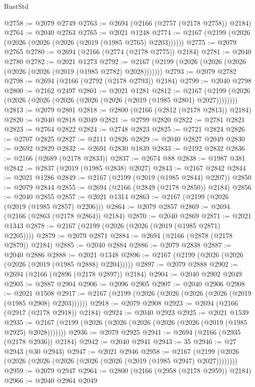 \begin{lexlean}{RustStd}
\begin{coremodule}
@2758 := @2079 @2749
@2763 := @2694 (@2166 (@2757 (@2178 @2758)) @2184)
@2764 := @2040 @2763
@2765 := @2021 @1248
@2774 := @2167 (@2199 (@2026 (@2026 (@2026 (@2026 (@2019 (@1985 @2765) @2203))))))
@2775 := @2079 @2765
@2780 := @2694 (@2166 (@2774 (@2178 @2775)) @2184)
@2781 := @2040 @2780
@2782 := @2021 @1273
@2792 := @2167 (@2199 (@2026 (@2026 (@2026 (@2026 (@2026 (@2019 (@1985 @2782) @2028)))))))
@2793 := @2079 @2782
@2798 := @2694 (@2166 (@2792 (@2178 @2793)) @2184)
@2799 := @2040 @2798
@2800 := @2162 @2497
@2801 := @2021 @1281
@2812 := @2167 (@2199 (@2026 (@2026 (@2026 (@2026 (@2026 (@2026 (@2019 (@1985 @2801) @2027))))))))
@2813 := @2079 @2801
@2818 := @2800 (@2166 (@2812 (@2178 @2813)) @2184)
@2820 := @2040 @2818 @2049
@2821 := @2799 @2820
@2822 := @2781 @2821
@2823 := @2764 @2822
@2824 := @2748 @2823
@2825 := @2721 @2824
@2826 := @2707 @2825
@2827 := @2111 @2826
@2829 := @2040 @2827 @2049
@2830 := @2692 @2829
@2832 := @2691 @2830 @1839
@2833 := @2192 @2832
@2836 := @2166 (@2689 (@2178 @2833))
@2837 := @2674 @88
@2838 := @1987 @381
@2842 := @2837 (@2019 (@1985 @2838) @2027)
@2843 := @2167 @2842
@2844 := @2021 @1286
@2849 := @2167 (@2199 (@2019 (@1985 @2844) @2207))
@2850 := @2079 @2844
@2855 := @2694 (@2166 (@2849 (@2178 @2850)) @2184)
@2856 := @2040 @2855
@2857 := @2021 @1314
@2863 := @2167 (@2199 (@2026 (@2019 (@1985 @2857) @2206)))
@2864 := @2079 @2857
@2869 := @2694 (@2166 (@2863 (@2178 @2864)) @2184)
@2870 := @2040 @2869
@2871 := @2021 @1343
@2878 := @2167 (@2199 (@2026 (@2026 (@2019 (@1985 @2871) @2205))))
@2879 := @2079 @2871
@2884 := @2694 (@2166 (@2878 (@2178 @2879)) @2184)
@2885 := @2040 @2884
@2886 := @2079 @2838
@2887 := @2040 @2886
@2888 := @2021 @1348
@2896 := @2167 (@2199 (@2026 (@2026 (@2026 (@2019 (@1985 @2888) @2204)))))
@2897 := @2079 @2888
@2902 := @2694 (@2166 (@2896 (@2178 @2897)) @2184)
@2904 := @2040 @2902 @2049
@2905 := @2887 @2904
@2906 := @2096 @2905
@2907 := @2040 @2906
@2908 := @2021 @1508
@2917 := @2167 (@2199 (@2026 (@2026 (@2026 (@2026 (@2019 (@1985 @2908) @2203))))))
@2918 := @2079 @2908
@2923 := @2694 (@2166 (@2917 (@2178 @2918)) @2184)
@2924 := @2040 @2923
@2925 := @2021 @1539
@2935 := @2167 (@2199 (@2026 (@2026 (@2026 (@2026 (@2026 (@2019 (@1985 @2925) @2028)))))))
@2936 := @2079 @2925
@2941 := @2694 (@2166 (@2935 (@2178 @2936)) @2184)
@2942 := @2040 @2941
@2943 := 35
@2946 := @27 @2943 (@30 @2943)
@2947 := @2021 @2946
@2958 := @2167 (@2199 (@2026 (@2026 (@2026 (@2026 (@2026 (@2026 (@2019 (@1985 @2947) @2027))))))))
@2959 := @2079 @2947
@2964 := @2800 (@2166 (@2958 (@2178 @2959)) @2184)
@2966 := @2040 @2964 @2049

\end{coremodule}
\end{lexlean}
